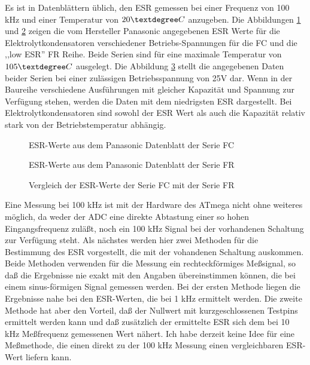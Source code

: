 Es ist in Datenblättern üblich, den ESR gemessen bei einer Frequenz von 100 kHz und
einer Temperatur von \(20\textdegree C\) anzugeben.
Die Abbildungen \ref{fig:Cap_FC_data} und \ref{fig:Cap_FR_data} zeigen die vom Hersteller Panasonic 
angegebenen ESR Werte für die Elektrolytkondensatoren verschiedener Betriebs-Spannungen für die FC und die ,,low ESR'' FR Reihe.
Beide Serien sind für eine maximale Temperatur von \(105\textdegree C\) ausgelegt.
Die Abbildung \ref{fig:Cap_FC_FR_data} stellt die angegebenen Daten beider Serien bei einer zulässigen Betriebsspannung
von 25V dar. Wenn in der Baureihe verschiedene Ausführungen mit gleicher Kapazität und Spannung zur Verfügung stehen,
werden die Daten mit dem niedrigsten ESR dargestellt.
Bei Elektrolytkondensatoren sind sowohl der ESR Wert als auch die Kapazität relativ stark von der Betriebstemperatur
abhängig.

\begin{figure}[H]
  \centering
    \resizebox{14cm}{!}{}
  \caption{ESR-Werte aus dem Panasonic Datenblatt der Serie FC}
  \label{fig:Cap_FC_data}
\end{figure}

\begin{figure}[H]
  \centering
    \resizebox{14cm}{!}{}
  \caption{ESR-Werte aus dem Panasonic Datenblatt der Serie FR}
  \label{fig:Cap_FR_data}
\end{figure}

\begin{figure}[H]
  \centering
    \resizebox{14cm}{!}{}
  \caption{Vergleich der ESR-Werte der Serie FC mit der Serie FR}
  \label{fig:Cap_FC_FR_data}
\end{figure}

Eine Messung bei 100 kHz ist mit der Hardware des ATmega nicht ohne weiteres möglich, da weder der ADC
eine direkte Abtastung einer so hohen Eingangsfrequenz zuläßt, noch ein 100 kHz Signal bei der vorhandenen Schaltung zur
Verfügung steht. 
Als nächstes werden hier zwei Methoden für die Bestimmung des ESR vorgestellt, die mit der vohandenen
Schaltung auskommen. 
Beide Methoden verwenden für die Messung ein rechteckförmiges Meßsignal, so daß die Ergebnisse nie
exakt mit den Angaben übereinstimmen können, die bei einem sinus-förmigen Signal gemessen werden.
Bei der ersten Methode liegen die Ergebnisse nahe bei den ESR-Werten, die bei 1 kHz ermittelt werden.
Die zweite Methode hat aber den Vorteil, daß der Nullwert mit kurzgeschlossenen Testpins ermittelt werden kann
und daß zusätzlich der ermittelte ESR sich dem bei 10 kHz Meßfrequenz gemessenen Wert nähert.
Ich habe derzeit keine Idee für eine Meßmethode, die einen direkt zu der 100 kHz Messung einen 
vergleichbaren ESR-Wert liefern kann.

